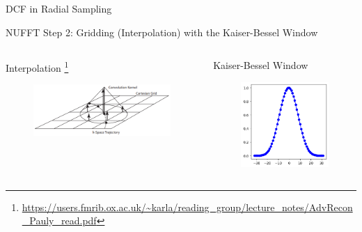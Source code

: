 \begin{frame}{DCF in Radial Sampling}
\end{frame}


\begin{frame}{NUFFT Step 2: Gridding (Interpolation) with the Kaiser-Bessel Window}

    \begin{columns}
	\begin{column}{0.65\textwidth}
		\centering
		Interpolation  \footnote{\url{https://users.fmrib.ox.ac.uk/~karla/reading_group/lecture_notes/AdvRecon_Pauly_read.pdf}}
		\begin{figure}
			\includegraphics[width=\columnwidth]{fig/interp.png}
		\end{figure}
	\end{column}

	\begin{column}{0.30\textwidth}
		\centering
		Kaiser-Bessel Window
		\begin{figure}
			\includegraphics[width=\columnwidth]{fig/kb.png}
		\end{figure}
	\end{column}
	\end{columns}

\end{frame}


